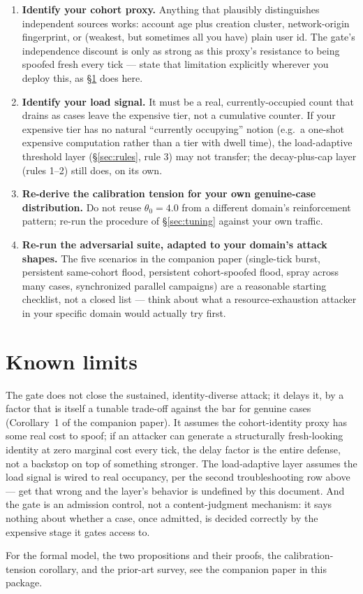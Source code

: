 \documentclass[11pt]{article}
\begin{document}
\begin{enumerate}
\item \textbf{Identify your cohort proxy.} Anything that plausibly
  distinguishes independent sources works: account age plus creation
  cluster, network-origin fingerprint, or (weakest, but sometimes all
  you have) plain user id. The gate's independence discount is only as
  strong as this proxy's resistance to being spoofed fresh every tick
  --- state that limitation explicitly wherever you deploy this, as
  \S\ref{sec:limits} does here.
\item \textbf{Identify your load signal.} It must be a real, currently-occupied
  count that drains as cases leave the expensive tier, not a
  cumulative counter. If your expensive tier has no natural
  ``currently occupying'' notion (e.g.\ a one-shot expensive computation
  rather than a tier with dwell time), the load-adaptive threshold layer
  (\S\ref{sec:rules}, rule 3) may not transfer; the decay-plus-cap layer
  (rules 1--2) still does, on its own.
\item \textbf{Re-derive the calibration tension for your own genuine-case
  distribution.} Do not reuse $\theta_0=4.0$ from a different domain's
  reinforcement pattern; re-run the procedure of \S\ref{sec:tuning}
  against your own traffic.
\item \textbf{Re-run the adversarial suite, adapted to your domain's
  attack shapes.} The five scenarios in the companion paper (single-tick
  burst, persistent same-cohort flood, persistent cohort-spoofed flood,
  spray across many cases, synchronized parallel campaigns) are a
  reasonable starting checklist, not a closed list --- think about
  what a resource-exhaustion attacker in your specific domain would
  actually try first.
\end{enumerate}

\section{Known limits}
\label{sec:limits}

The gate does not close the sustained, identity-diverse attack; it
delays it, by a factor that is itself a tunable trade-off against the
bar for genuine cases (Corollary~1 of the companion paper). It assumes
the cohort-identity proxy has some real cost to spoof; if an attacker
can generate a structurally fresh-looking identity at zero marginal cost
every tick, the delay factor is the entire defense, not a backstop on
top of something stronger. The load-adaptive layer assumes the load
signal is wired to real occupancy, per the second troubleshooting
row above --- get that wrong and the layer's behavior is undefined by
this document. And the gate is an admission control, not a
content-judgment mechanism: it says nothing about whether a case, once
admitted, is decided correctly by the expensive stage it gates access
to.

For the formal model, the two propositions and their proofs, the
calibration-tension corollary, and the prior-art survey, see the
companion paper in this package.
\end{document}
